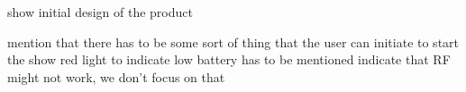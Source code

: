 show initial design of the product

mention that there has to be some sort of thing that the user can initiate to start the show
red light to indicate low battery has to be mentioned
indicate that RF might not work, we don't focus on that